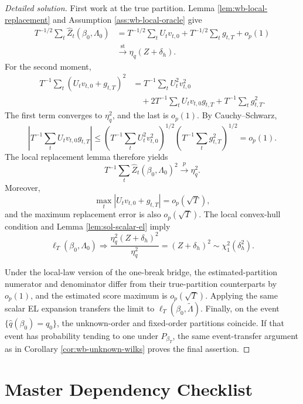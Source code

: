\documentclass[12pt]{article}
\numberwithin{equation}{section}
\theoremstyle{definition}
\begin{document}
\begin{proof}[Detailed solution]
First work at the true partition.  Lemma \ref{lem:wb-local-replacement} and
Assumption \ref{ass:wb-local-oracle} give
\begin{align*}
    T^{-1/2}\sum_t\widehat Z_t(\beta_0,\Lambda_0)
    &=T^{-1/2}\sum_tU_tv_{t,0}
      +T^{-1/2}\sum_tg_{t,T}+o_p(1)\\
    &\xrightarrow{\mathrm{st}}\eta_q(Z+\delta_h).
\end{align*}
For the second moment,
\begin{align*}
    T^{-1}\sum_t(U_tv_{t,0}+g_{t,T})^2
    &=T^{-1}\sum_tU_t^2v_{t,0}^2\\
    &\quad+2T^{-1}\sum_tU_tv_{t,0}g_{t,T}
      +T^{-1}\sum_tg_{t,T}^2.
\end{align*}
The first term converges to \(\eta_q^2\), and the last is \(o_p(1)\).  By
Cauchy--Schwarz,
\[
    \left|T^{-1}\sum_tU_tv_{t,0}g_{t,T}\right|
    \leq
    \left(T^{-1}\sum_tU_t^2v_{t,0}^2\right)^{1/2}
    \left(T^{-1}\sum_tg_{t,T}^2\right)^{1/2}
    =o_p(1).
\]
The local replacement lemma therefore yields
\[
    T^{-1}\sum_t\widehat Z_t(\beta_0,\Lambda_0)^2
    \xrightarrow{p}\eta_q^2.
\]
Moreover,
\[
    \max_t|U_tv_{t,0}+g_{t,T}|=o_p(\sqrt T),
\]
and the maximum replacement error is also \(o_p(\sqrt T)\).  The local
convex-hull condition and Lemma \ref{lem:sol-scalar-el} imply
\[
    \ell_T(\beta_0,\Lambda_0)
    \Rightarrow
    \frac{\eta_q^2(Z+\delta_h)^2}{\eta_q^2}
    =(Z+\delta_h)^2
    \sim\chi_1^2(\delta_h^2).
\]

Under the local-law version of the one-break bridge, the estimated-partition
numerator and denominator differ from their true-partition counterparts by
\(o_p(1)\), and the estimated score maximum is \(o_p(\sqrt T)\).  Applying the
same scalar EL expansion transfers the limit to
\(\ell_T(\beta_0,\widetilde\Lambda)\).  Finally, on the event
\(\{\widehat q(\beta_0)=q_0\}\), the unknown-order and fixed-order partitions
coincide.  If that event has probability tending to one under
\(P_{\beta_T}\), the same event-transfer argument as in Corollary
\ref{cor:wb-unknown-wilks} proves the final assertion.
\end{proof}


\section{Master Dependency Checklist}
\end{document}
